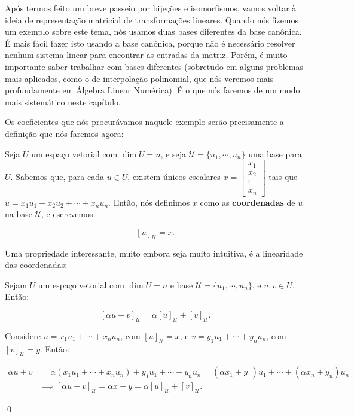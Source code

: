 Após termos feito um breve passeio por bijeções e isomorfismos, vamos voltar à ideia de representação matricial de transformações lineares. Quando nós fizemos um exemplo sobre este tema, nós usamos duas bases diferentes da base canônica. É mais fácil fazer isto usando a base canônica, porque não é necessário resolver nenhum sistema linear para encontrar as entradas da matriz. Porém, é muito importante saber trabalhar com bases diferentes (sobretudo em alguns problemas mais aplicados, como o de interpolação polinomial, que nós veremos mais profundamente em Álgebra Linear Numérica). É o que nós faremos de um modo mais sistemático neste capítulo.

Os coeficientes que nós procurávamos naquele exemplo serão precisamente a definição que nós faremos agora:

\begin{Definition}[Coordenadas]
	Seja $U$ um espaço vetorial com $\dim U = n$, e seja $\mathcal{U} = \{u_1, \cdots, u_n\}$ uma base para $U$. Sabemos que, para cada $u\in U$, existem únicos escalares $x = \begin{bmatrix}
		x_1 \\
		x_2 \\
		\vdots \\
		x_n
	\end{bmatrix}$ tais que $u = x_1u_1 + x_2u_2 + \cdots + x_nu_n$. Então, nós definimos $x$ como as \textbf{coordenadas} de $u$ na base $\mathcal{U}$, e escrevemos:
	
	$$
	[u]_\mathcal{U} = x.
	$$
\end{Definition}

Uma propriedade interessante, muito embora seja muito intuitiva, é a linearidade das coordenadas:

\begin{Proposition}
	Sejam $U$ um espaço vetorial com $\dim U = n$ e base $\mathcal{U} = \{u_1, \cdots, u_n\}$, e $u, v\in U$. Então:
	
	$$
	[\alpha u + v]_\mathcal{U} = \alpha[u]_\mathcal{U} + [v]_\mathcal{U}.
	$$
\end{Proposition}

\begin{Proof}
	Considere $u = x_1u_1 + \cdots + x_nu_n$, com $[u]_\mathcal{U} = x$, e $v = y_1u_1 + \cdots + y_nu_n$, com $[v]_\mathcal{U} = y$. Então:
	
	\begin{align*}
		\alpha u + v &= \alpha(x_1u_1 + \cdots + x_nu_n) + y_1u_1 + \cdots + y_nu_n = (\alpha x_1 + y_1)u_1 + \cdots + (\alpha x_n + y_n)u_n \\ &\implies [\alpha u + v]_\mathcal{U} = \alpha x + y = \alpha [u]_\mathcal{U} + [v]_\mathcal{U}.
	\end{align*}
	
	\qed
\end{Proof}

